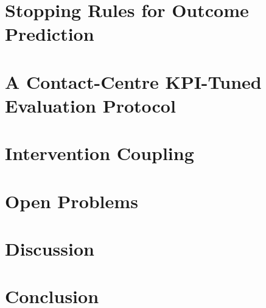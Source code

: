 \documentclass[11pt,a4paper]{article}
\begin{document}
\section{Stopping Rules for Outcome Prediction}
\label{sec:stopping}


\section{A Contact-Centre KPI-Tuned Evaluation Protocol}
\label{sec:evaluation}


\section{Intervention Coupling}
\label{sec:intervention}


\section{Open Problems}
\label{sec:open_problems}


\section{Discussion}
\label{sec:discussion}


\section{Conclusion}
\label{sec:conclusion}




\end{document}
